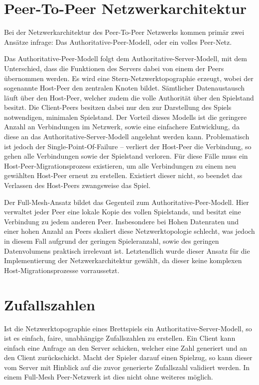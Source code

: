 \section{Peer-To-Peer Netzwerkarchitektur}
Bei der Netzwerkarchitektur des Peer-To-Peer Netzwerks kommen primär zwei Ansätze infrage: Das Authoritative-Peer-Modell, oder ein volles Peer-Netz.\par 

Das Authoritative-Peer-Modell folgt dem Authoritative-Server-Modell, mit dem Unterschied, dass die Funktionen des Servers dabei von einem der Peers übernommen werden. Es wird eine Stern-Netzwerktopographie erzeugt, wobei der sogenannte \glqq{}Host-Peer\grqq{} den zentralen Knoten bildet. Sämtlicher Datenaustausch läuft über den Host-Peer, welcher zudem die volle Authorität über den Spielstand besitzt. Die Client-Peers besitzen dabei nur den zur Darstellung des Spiels notwendigen, minimalen Spielstand. Der Vorteil dieses Modells ist die geringere Anzahl an Verbindungen im Netzwerk, sowie eine einfachere Entwicklung, da diese an das Authoritative-Server-Modell angelehnt werden kann. Problematisch ist jedoch der Single-Point-Of-Failure -- verliert der Host-Peer die Verbindung, so gehen alle Verbindungen sowie der Spielstand verloren. Für diese Fälle muss ein \glqq{}Host-Peer-Migrationsprozess\grqq{} existieren, um alle Verbindungen zu einem neu gewählten Host-Peer erneut zu erstellen. Existiert dieser nicht, so beendet das Verlassen des Host-Peers zwangsweise das Spiel.\par

Der Full-Mesh-Ansatz bildet das Gegenteil zum Authoritative-Peer-Modell. Hier verwaltet jeder Peer eine lokale Kopie des vollen Spielstands, und besitzt eine Verbindung zu jedem anderen Peer. Insbesondere bei Hohen Datenraten und einer hohen Anzahl an Peers skaliert diese Netzwerktopologie schlecht, was jedoch in diesem Fall aufgrund der geringen Spieleranzahl, sowie des geringen Datenvolumens praktisch irrelevant ist. Letztendlich wurde dieser Ansatz für die Implementierung der Netzwerkarchitektur gewählt, da dieser keine komplexen Host-Migrationsprozesse vorraussetzt.\par

\section{Zufallszahlen}
Ist die Netzwerktopographie eines Brettspiels ein Authoritative-Server-Modell, so ist es einfach, faire, unabhängige Zufallszahlen zu erstellen. Ein Client kann einfach eine Anfrage an den Server schicken, welcher eine Zahl generiert und an den Client zurückschickt. Macht der Spieler darauf einen Spielzug, so kann dieser vom Server mit Hinblick auf die zuvor generierte Zufallszahl validiert werden. In einem Full-Mesh Peer-Netzwerk ist dies nicht ohne weiteres möglich.\par

